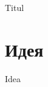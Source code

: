 \documentclass[a4paper,12pt]{book} %
\begin{document}
 	
	{Titul}

	\tableofcontents

	\newpage

    \chapter{Идея}
    {Idea}
 
\end{document}
